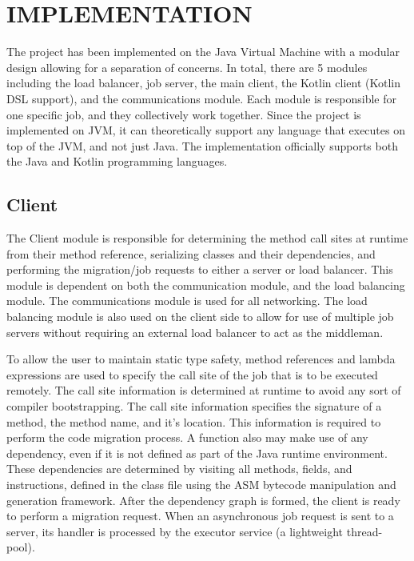 \section{IMPLEMENTATION}\label{sec:impl}

The project has been implemented on the Java Virtual Machine with a modular design allowing for
a separation of concerns.
In total, there are 5 modules including the load balancer, job server, the main client,
the Kotlin client (Kotlin DSL support), and the communications module.
Each module is responsible for one specific job, and they collectively work together.
Since the project is implemented on JVM, it can theoretically support any language
that executes on top of the JVM, and not just Java.
The implementation officially supports both the Java and Kotlin programming languages.

\subsection{Client}\label{subsec:client}
The Client module is responsible for determining the method call sites at runtime from their
method reference, serializing classes and their dependencies, and performing the migration/job
requests to either a server or load balancer.
This module is dependent on both the communication module, and the load balancing module.
The communications module is used for all networking.
The load balancing module is also used on the client side to allow for use of multiple
job servers without requiring an external load balancer to act as the middleman.

To allow the user to maintain static type safety, method references and lambda expressions
are used to specify the call site of the job that is to be executed remotely.
The call site information is determined at runtime to avoid any sort of compiler
bootstrapping.
The call site information specifies the signature of a method, the method name, and it's location.
This information is required to perform the code migration process.
A function also may make use of any dependency, even if it is not defined as part of the Java
runtime environment.
These dependencies are determined by visiting all methods, fields, and instructions,
defined in the class file using the ASM bytecode manipulation and generation framework.
After the dependency graph is formed, the client is ready to perform a migration request.
When an asynchronous job request is sent to a server, its handler is processed by the executor service
(a lightweight thread-pool).

